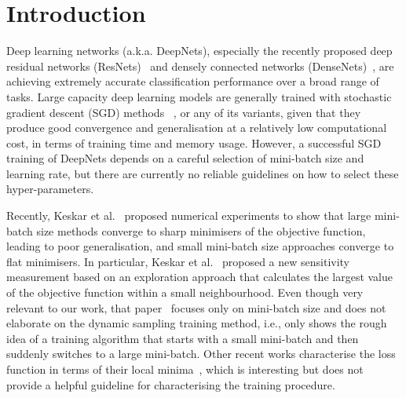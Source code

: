 \documentclass[10pt,journal,compsoc]{IEEEtran}
\begin{document}
\section{Introduction}
\label{sec:introduction}

Deep learning networks (a.k.a. DeepNets), especially the recently proposed deep residual networks (ResNets)~\cite{he2016deep,huang2016deep} and densely connected networks (DenseNets)~\cite{huang2016densely}, are achieving extremely accurate classification performance over a broad range of tasks. 
Large capacity deep learning models are generally trained with  stochastic gradient descent (SGD) methods ~\cite{robbins1951stochastic}, or any of its variants, given that they produce good convergence and generalisation at a relatively low computational cost, in terms of training time and memory usage.
However, a successful SGD training of DeepNets depends on a careful selection of mini-batch size and learning rate, but there are currently no reliable guidelines on how to select these hyper-parameters.
 

Recently, Keskar et al.~\cite{keskar2016large} proposed numerical experiments to show that large mini-batch size methods converge to sharp minimisers of the objective function, leading to poor generalisation, and small mini-batch size approaches converge to flat minimisers. 
In particular, Keskar et al.~\cite{keskar2016large} proposed a new sensitivity measurement based on an exploration approach that calculates the largest value of the objective function within a small neighbourhood.  
Even though very relevant to our work, that paper~\cite{keskar2016large} focuses only on mini-batch size and does not elaborate on the dynamic sampling training method, i.e., only shows the rough idea of a training algorithm that starts with a small mini-batch and then suddenly switches to a large mini-batch.
Other recent works characterise the loss function in terms of their local minima~\cite{littwin2016loss,soudry2016no,lee2016gradient}, which is interesting but does not provide a helpful guideline for characterising the training procedure.
\end{document}
